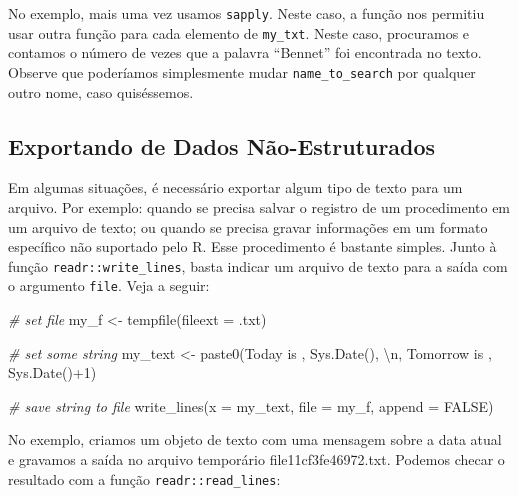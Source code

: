 \documentclass[
  11pt,
]{book}
\newenvironment{Shaded}{\begin{snugshade}}{\end{snugshade}}
\newcommand{\AttributeTok}[1]{\textcolor[rgb]{0.61,0.61,0.61}{#1}}
\newcommand{\CommentTok}[1]{\textcolor[rgb]{0.37,0.37,0.37}{\textit{#1}}}
\newcommand{\ConstantTok}[1]{\textcolor[rgb]{0,0,0}{#1}}
\newcommand{\DecValTok}[1]{\textcolor[rgb]{0.06,0.06,0.06}{#1}}
\newcommand{\FunctionTok}[1]{\textcolor[rgb]{0,0,0}{#1}}
\newcommand{\NormalTok}[1]{#1}
\newcommand{\OtherTok}[1]{\textcolor[rgb]{0.37,0.37,0.37}{#1}}
\newcommand{\SpecialCharTok}[1]{\textcolor[rgb]{0,0,0}{#1}}
\newcommand{\StringTok}[1]{\textcolor[rgb]{0.5,0.5,0.5}{#1}}
\begin{document}
No exemplo, mais uma vez usamos \texttt{sapply}. Neste caso, a função nos permitiu usar outra função para cada elemento de \texttt{my\_txt}. Neste caso, procuramos e contamos o número de vezes que a palavra ``Bennet'' foi encontrada no texto. Observe que poderíamos simplesmente mudar \texttt{name\_to\_search} por qualquer outro nome, caso quiséssemos.

\hypertarget{exportando-de-dados-nuxe3o-estruturados}{%
\subsection{Exportando de Dados Não-Estruturados}\label{exportando-de-dados-nuxe3o-estruturados}}

Em algumas situações, é necessário exportar algum tipo de texto para um arquivo. Por exemplo: quando se precisa salvar o registro de um procedimento em um arquivo de texto; ou quando se precisa gravar informações em um formato específico não suportado pelo R. Esse procedimento é bastante simples. Junto à função \texttt{readr::write\_lines}, basta indicar um arquivo de texto para a saída com o argumento \texttt{file}. Veja a seguir:

\begin{Shaded}
\begin{Highlighting}[]
\CommentTok{\# set file}
\NormalTok{my\_f }\OtherTok{\textless{}{-}} \FunctionTok{tempfile}\NormalTok{(}\AttributeTok{fileext =} \StringTok{\textquotesingle{}.txt\textquotesingle{}}\NormalTok{)}

\CommentTok{\# set some string}
\NormalTok{my\_text }\OtherTok{\textless{}{-}} \FunctionTok{paste0}\NormalTok{(}\StringTok{\textquotesingle{}Today is \textquotesingle{}}\NormalTok{, }\FunctionTok{Sys.Date}\NormalTok{(), }\StringTok{\textquotesingle{}}\SpecialCharTok{\textbackslash{}n}\StringTok{\textquotesingle{}}\NormalTok{, }
                  \StringTok{\textquotesingle{}Tomorrow is \textquotesingle{}}\NormalTok{, }\FunctionTok{Sys.Date}\NormalTok{()}\SpecialCharTok{+}\DecValTok{1}\NormalTok{)}

\CommentTok{\# save string to file}
\FunctionTok{write\_lines}\NormalTok{(}\AttributeTok{x =}\NormalTok{ my\_text, }\AttributeTok{file =}\NormalTok{ my\_f, }\AttributeTok{append =} \ConstantTok{FALSE}\NormalTok{)}
\end{Highlighting}
\end{Shaded}

No exemplo, criamos um objeto de texto com uma mensagem sobre a data atual e gravamos a saída no arquivo temporário file11cf3fe46972.txt. Podemos checar o resultado com a função \texttt{readr::read\_lines}:
\end{document}
